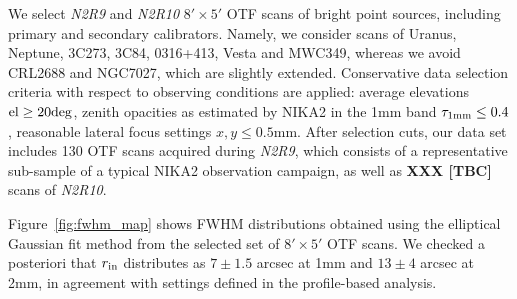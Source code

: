We select \emph{N2R9} and \emph{N2R10} $8' \times 5'$ OTF scans of
bright point sources, including primary and secondary
calibrators. Namely, we consider scans of Uranus, Neptune, 3C273,
3C84, 0316+413, Vesta and MWC349, whereas we avoid CRL2688 and
NGC7027, which are slightly extended. Conservative data selection
criteria with respect to observing conditions are applied: average
elevations $\rm{el} \ge 20 \rm{deg}$, zenith opacities as estimated by
NIKA2 in the 1mm band $\tau_{1\rm{mm}} \le 0.4$, reasonable lateral
focus settings $x, y \le 0.5$mm. After selection cuts, our data set
includes 130 OTF scans acquired during \emph{N2R9}, which consists of
a representative sub-sample of a typical NIKA2 observation campaign,
as well as {\bf XXX [TBC]} scans of \emph{N2R10}. 

Figure~\ref{fig:fwhm_map} shows FWHM distributions obtained using
the elliptical Gaussian fit method from the selected set of $8' \times 5'$ OTF scans.
We checked a posteriori that $r_{\rm{in}}$ distributes as $7 \pm 1.5$ arcsec at 1mm and $13 \pm 4$ arcsec at 2mm, in agreement with settings defined in the profile-based analysis.


